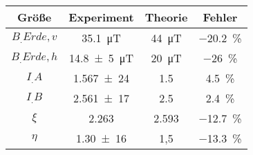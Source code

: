 \label{tab:tabFehler}
	\begin{tabular}{cS[table-format=2.1]S[table-format=2.1]S[table-format=3.2]}
		\toprule
		{Größe}&{Experiment}&{Theorie}&{Fehler}\\
		\midrule
		$B_.{Erde,v}$ & \SI{35,1}{\micro\tesla} & \SI{44}{\micro\tesla}  & \SI{-20,2}{\%} \\
		$B_.{Erde,h}$ & \SI{14,8(5)}{\micro\tesla} & \SI{20}{\micro\tesla} & \SI{-26}{\%}\\
		$I_.A$ & \num{1,567(24)} & 1.5 & \SI{4.5}{\%}\\
		$I_.B$ & \num{2,561(17)} & 2.5 & \SI{2.4}{\%}\\
		$\xi$ & 2.263 & 2.593 & \SI{-12.7}{\%}\\
		$\eta$ & \num{1,30(16)} & 1,5 & \SI{-13.3}{\%}\\
		\bottomrule
	\end{tabular}
